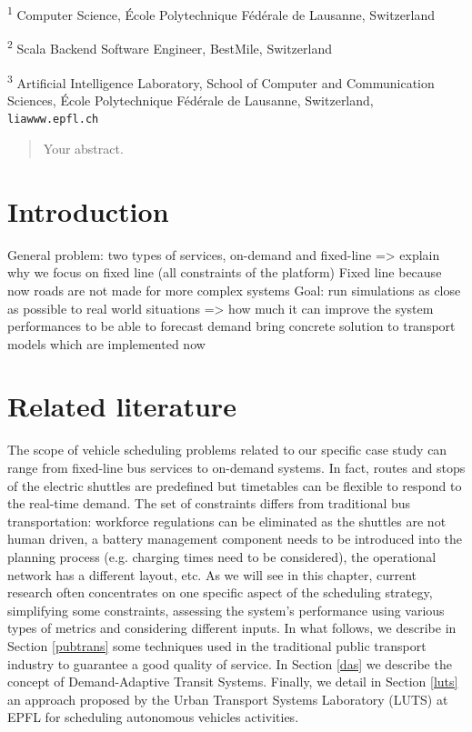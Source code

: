 \documentclass[12pt,a4paper]{article}
\begin{document}
\small \textsuperscript{1} Computer Science,  \'Ecole Polytechnique F\'ed\'erale de Lausanne, Switzerland

\small \textsuperscript{2} Scala Backend Software Engineer, BestMile, Switzerland 

\small \textsuperscript{3} Artificial Intelligence Laboratory, School of Computer and Communication Sciences, \'Ecole Polytechnique F\'ed\'erale de Lausanne, Switzerland, \verb+liawww.epfl.ch+ 




\newpage


\begin{abstract}
Your abstract.
\end{abstract}

\newpage

\tableofcontents
\newpage
\setlength{\parskip}{0.5em}
\section{Introduction}
General problem: two types of services, on-demand and fixed-line => explain why we focus on fixed line (all constraints of the platform) 
Fixed line because now roads are not made for more complex systems
Goal: run simulations as close as possible to real world situations
=> how much it can improve the system performances to be able to forecast demand
bring concrete solution to transport models which are implemented now

\section{Related literature}\label{literature} 
The scope of vehicle scheduling problems related to our specific case study can range from fixed-line bus services to on-demand systems. In fact, routes and stops of the electric shuttles are predefined but timetables can be flexible to respond to the real-time demand. The set of constraints differs from traditional bus transportation: workforce regulations can be eliminated as the shuttles are not human driven, a battery management component needs to be introduced into the planning process (e.g. charging times need to be considered), the operational network has a different layout, etc. As we will see in this chapter, current research often concentrates on one specific aspect of the scheduling strategy, simplifying some constraints, assessing the system's performance using various types of metrics and considering different inputs. In what follows, we describe in Section \ref{pubtrans} some techniques used in the traditional public transport industry to guarantee a good quality of service. In Section \ref{das} we describe the concept of Demand-Adaptive Transit Systems. Finally, we detail in Section \ref{luts} an approach proposed by the Urban Transport Systems Laboratory (LUTS) at EPFL for scheduling autonomous vehicles activities.  
\end{document}
